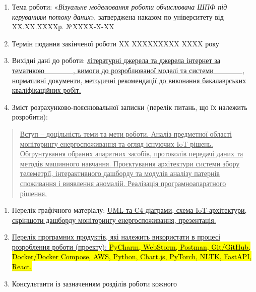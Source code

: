 \documentclass[
]{article}
\begin{document}
\begin{enumerate}
\def\labelenumi{\arabic{enumi}.}
\item
  Тема роботи: «\emph{Візуальне моделювання роботи обчислювача ШПФ під
  керуванням потоку даних}», затверджена наказом по університету від
  XX.XX.XXXXр. №XXXX-X-XX
\item
  Термін подання закінченої роботи XX XXXXXXXXX XXXX року
\item
  Вихідні дані до роботи: \ul{літературні джерела та джерела інтернет за
  тематикою \_\_\_\_\_, вимоги до розроблюваної моделі та системи
  \_\_\_\_\_, нормативні документи, методичні рекомендації до виконання
  бакалаврських кваліфікаційних робіт.}
\item
  Зміст розрахунково-пояснювальної записки (перелік питань, що їх
  належить розробити):
\end{enumerate}

\begin{quote}
\ul{Вступ -- доцільність теми та мети роботи. Аналіз предметної області
моніторингу енергоспоживання та огляд існуючих IoT-рішень. Обґрунтування
обраних апаратних засобів, протоколів передачі даних та методів
машинного навчання. Проєктування архітектури системи збору телеметрії,
інтерактивного дашборду та модулів аналізу патернів споживання і
виявлення аномалій. Реалізація програмноапаратного рішення.}
\end{quote}

\begin{enumerate}
\def\labelenumi{\arabic{enumi}.}
\setcounter{enumi}{4}
\item
  Перелік графічного матеріалу: \ul{UML та C4 діаграми, схема
  IoT-архітектури, скріншоти дашборду моніторингу енергоспоживання,
  презентація.}
\item
  \ul{Перелік програмних продуктів, які належить використати в процесі
  розроблення роботи (проекту): \hl{PyCharm, WebStorm, Postman,
  Git/GitHub, Docker/Docker Compose, AWS, Python, Chart.js, PyTorch,
  NLTK, FastAPI, React.}}
\item
  Консультанти із зазначенням розділів роботи кожного
\end{enumerate}
\end{document}
